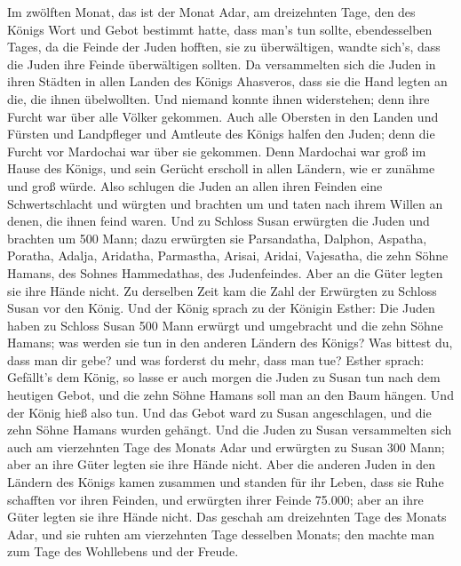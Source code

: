  Im zwölften Monat, das ist der Monat Adar, am dreizehnten
Tage, den des Königs Wort und Gebot bestimmt hatte, dass man's tun
sollte, ebendesselben Tages, da die Feinde der Juden hofften, sie zu
überwältigen, wandte sich's, dass die Juden ihre Feinde überwältigen
sollten.  Da versammelten sich die Juden in ihren Städten
in allen Landen des Königs Ahasveros, dass sie die Hand legten an die,
die ihnen übelwollten. Und niemand konnte ihnen widerstehen; denn ihre
Furcht war über alle Völker gekommen.  Auch alle Obersten
in den Landen und Fürsten und Landpfleger und Amtleute des Königs halfen
den Juden; denn die Furcht vor Mardochai war über sie gekommen.
 Denn Mardochai war groß im Hause des Königs, und sein
Gerücht erscholl in allen Ländern, wie er zunähme und groß würde.
 Also schlugen die Juden an allen ihren Feinden eine
Schwertschlacht und würgten und brachten um und taten nach ihrem Willen
an denen, die ihnen feind waren.  Und zu Schloss Susan
erwürgten die Juden und brachten um 500 Mann;  dazu
erwürgten sie Parsandatha, Dalphon, Aspatha,  Poratha,
Adalja, Aridatha,  Parmastha, Arisai, Aridai, Vajesatha,
 die zehn Söhne Hamans, des Sohnes Hammedathas, des
Judenfeindes. Aber an die Güter legten sie ihre Hände nicht.
 Zu derselben Zeit kam die Zahl der Erwürgten zu Schloss
Susan vor den König.  Und der König sprach zu der Königin
Esther: Die Juden haben zu Schloss Susan 500 Mann erwürgt und umgebracht
und die zehn Söhne Hamans; was werden sie tun in den anderen Ländern des
Königs? Was bittest du, dass man dir gebe? und was forderst du mehr,
dass man tue?  Esther sprach: Gefällt's dem König, so
lasse er auch morgen die Juden zu Susan tun nach dem heutigen Gebot, und
die zehn Söhne Hamans soll man an den Baum hängen.  Und
der König hieß also tun. Und das Gebot ward zu Susan angeschlagen, und
die zehn Söhne Hamans wurden gehängt.  Und die Juden zu
Susan versammelten sich auch am vierzehnten Tage des Monats Adar und
erwürgten zu Susan 300 Mann; aber an ihre Güter legten sie ihre Hände
nicht.  Aber die anderen Juden in den Ländern des Königs
kamen zusammen und standen für ihr Leben, dass sie Ruhe schafften vor
ihren Feinden, und erwürgten ihrer Feinde 75.000; aber an ihre Güter
legten sie ihre Hände nicht.  Das geschah am dreizehnten
Tage des Monats Adar, und sie ruhten am vierzehnten Tage desselben
Monats; den machte man zum Tage des Wohllebens und der Freude.
